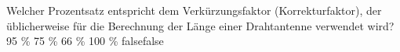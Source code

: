     {Welcher Prozentsatz entspricht dem Verkürzungsfaktor (Korrekturfaktor), der üblicherweise für die Berechnung der Länge einer Drahtantenne verwendet wird?}
    {95 \%}
    {75 \%}
    {66 \%}
    {100 \%}
    {false}{false}
